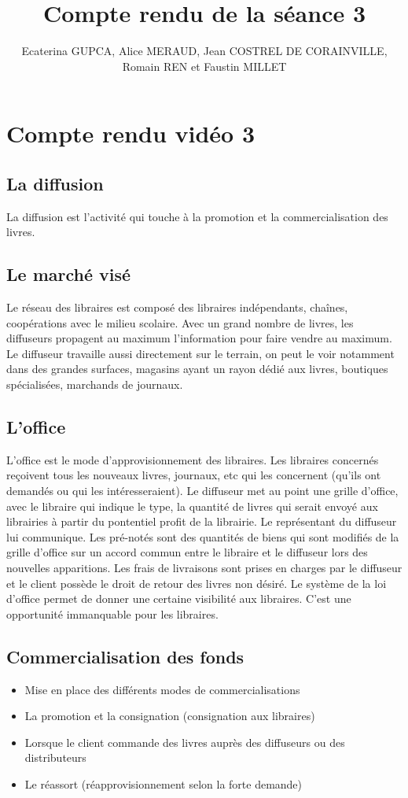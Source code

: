\documentclass[a4paper, 13pt]{article}
\begin{document}
\title{Compte rendu de la séance 3}
\author{Ecaterina GUPCA, Alice MERAUD, Jean COSTREL DE CORAINVILLE, Romain REN et Faustin MILLET}
\maketitle

\section{Compte rendu vidéo 3}
\subsection{La diffusion}
La diffusion est l’activité qui touche à la promotion et la commercialisation des livres.
\subsection{Le marché visé}
Le réseau des libraires est composé des libraires indépendants, chaînes, coopérations avec le milieu scolaire. Avec un grand nombre de livres, les diffuseurs propagent au maximum l'information pour faire vendre au maximum. Le diffuseur travaille aussi directement sur le terrain, on peut le voir notamment dans des grandes surfaces, magasins ayant un rayon dédié aux livres, boutiques spécialisées, marchands de journaux.
\subsection{L’office}
L'office est le mode d'approvisionnement des libraires.
Les libraires concernés reçoivent tous les nouveaux livres, journaux, etc qui les concernent (qu'ils ont demandés ou qui les intéresseraient). Le diffuseur met au point une grille d’office, avec le libraire qui indique le type, la quantité de livres qui serait envoyé aux librairies à partir du pontentiel profit de la librairie. Le représentant du diffuseur lui communique.
Les pré-notés sont des quantités de biens qui sont modifiés de la grille d’office sur un accord commun entre le libraire et le diffuseur lors des nouvelles apparitions. 
Les frais de livraisons sont prises en charges par le diffuseur et le client possède le droit de retour des livres non désiré.
Le système de la loi d’office permet de donner une certaine visibilité aux libraires. C’est une opportunité immanquable pour les libraires.  
\subsection{Commercialisation des fonds}
\begin{itemize}
    \item Mise en place des différents modes de commercialisations
    \item La promotion et la consignation (consignation aux libraires)  
    \item Lorsque le client commande des livres auprès des diffuseurs ou des distributeurs
    \item Le réassort (réapprovisionnement selon la forte demande)
\end{itemize}
\end{document}
